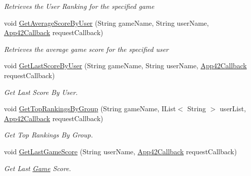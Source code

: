 \begin{DoxyCompactItemize}
\begin{DoxyCompactList}\small\item\em Retrieves the User Ranking for the specified game \end{DoxyCompactList}\item 
void \hyperlink{classcom_1_1shephertz_1_1app42_1_1paas_1_1sdk_1_1windows_1_1game_1_1_score_board_service_a0e0a6a0814d03022aec11a700579ef48}{Get\+Average\+Score\+By\+User} (String game\+Name, String user\+Name, \hyperlink{interfacecom_1_1shephertz_1_1app42_1_1paas_1_1sdk_1_1windows_1_1_app42_callback}{App42\+Callback} request\+Callback)
\begin{DoxyCompactList}\small\item\em Retrieves the average game score for the specified user \end{DoxyCompactList}\item 
void \hyperlink{classcom_1_1shephertz_1_1app42_1_1paas_1_1sdk_1_1windows_1_1game_1_1_score_board_service_a768879e1306c0fb37fd04de753772928}{Get\+Last\+Score\+By\+User} (String game\+Name, String user\+Name, \hyperlink{interfacecom_1_1shephertz_1_1app42_1_1paas_1_1sdk_1_1windows_1_1_app42_callback}{App42\+Callback} request\+Callback)
\begin{DoxyCompactList}\small\item\em Get Last Score By User. \end{DoxyCompactList}\item 
void \hyperlink{classcom_1_1shephertz_1_1app42_1_1paas_1_1sdk_1_1windows_1_1game_1_1_score_board_service_a111c4267d4239e7979c3b3fd952ca743}{Get\+Top\+Rankings\+By\+Group} (String game\+Name, I\+List$<$ String $>$ user\+List, \hyperlink{interfacecom_1_1shephertz_1_1app42_1_1paas_1_1sdk_1_1windows_1_1_app42_callback}{App42\+Callback} request\+Callback)
\begin{DoxyCompactList}\small\item\em Get Top Rankings By Group. \end{DoxyCompactList}\item 
void \hyperlink{classcom_1_1shephertz_1_1app42_1_1paas_1_1sdk_1_1windows_1_1game_1_1_score_board_service_a332054aa76d2c6a04238d51617598913}{Get\+Last\+Game\+Score} (String user\+Name, \hyperlink{interfacecom_1_1shephertz_1_1app42_1_1paas_1_1sdk_1_1windows_1_1_app42_callback}{App42\+Callback} request\+Callback)
\begin{DoxyCompactList}\small\item\em Get Last \hyperlink{classcom_1_1shephertz_1_1app42_1_1paas_1_1sdk_1_1windows_1_1game_1_1_game}{Game} Score. \end{DoxyCompactList}\item 

\end{DoxyCompactItemize}

